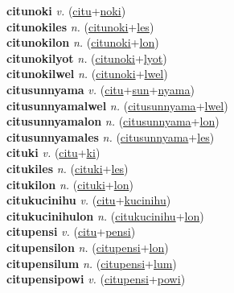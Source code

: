\textbf{citunoki} \textit{v.} (\hyperref[citu]{citu}+\hyperref[noki]{noki})
 \label{citunoki} \\
\textbf{citunokiles} \textit{n.} (\hyperref[citunoki]{citunoki}+\hyperref[les]{les})
 \label{citunokiles} \\
\textbf{citunokilon} \textit{n.} (\hyperref[citunoki]{citunoki}+\hyperref[lon]{lon})
 \label{citunokilon} \\
\textbf{citunokilyot} \textit{n.} (\hyperref[citunoki]{citunoki}+\hyperref[lyot]{lyot})
 \label{citunokilyot} \\
\textbf{citunokilwel} \textit{n.} (\hyperref[citunoki]{citunoki}+\hyperref[lwel]{lwel})
 \label{citunokilwel} \\
\textbf{citusunnyama} \textit{v.} (\hyperref[citu]{citu}+\hyperref[sun]{sun}+\hyperref[nyama]{nyama})
 \label{citusunnyama} \\
\textbf{citusunnyamalwel} \textit{n.} (\hyperref[citusunnyama]{citusunnyama}+\hyperref[lwel]{lwel})
 \label{citusunnyamalwel} \\
\textbf{citusunnyamalon} \textit{n.} (\hyperref[citusunnyama]{citusunnyama}+\hyperref[lon]{lon})
 \label{citusunnyamalon} \\
\textbf{citusunnyamales} \textit{n.} (\hyperref[citusunnyama]{citusunnyama}+\hyperref[les]{les})
 \label{citusunnyamales} \\
\textbf{cituki} \textit{v.} (\hyperref[citu]{citu}+\hyperref[ki]{ki})
 \label{cituki} \\
\textbf{citukiles} \textit{n.} (\hyperref[cituki]{cituki}+\hyperref[les]{les})
 \label{citukiles} \\
\textbf{citukilon} \textit{n.} (\hyperref[cituki]{cituki}+\hyperref[lon]{lon})
 \label{citukilon} \\
\textbf{citukucinihu} \textit{v.} (\hyperref[citu]{citu}+\hyperref[kucinihu]{kucinihu})
 \label{citukucinihu} \\
\textbf{citukucinihulon} \textit{n.} (\hyperref[citukucinihu]{citukucinihu}+\hyperref[lon]{lon})
 \label{citukucinihulon} \\
\textbf{citupensi} \textit{v.} (\hyperref[citu]{citu}+\hyperref[pensi]{pensi})
 \label{citupensi} \\
\textbf{citupensilon} \textit{n.} (\hyperref[citupensi]{citupensi}+\hyperref[lon]{lon})
 \label{citupensilon} \\
\textbf{citupensilum} \textit{n.} (\hyperref[citupensi]{citupensi}+\hyperref[lum]{lum})
 \label{citupensilum} \\
\textbf{citupensipowi} \textit{v.} (\hyperref[citupensi]{citupensi}+\hyperref[powi]{powi})
